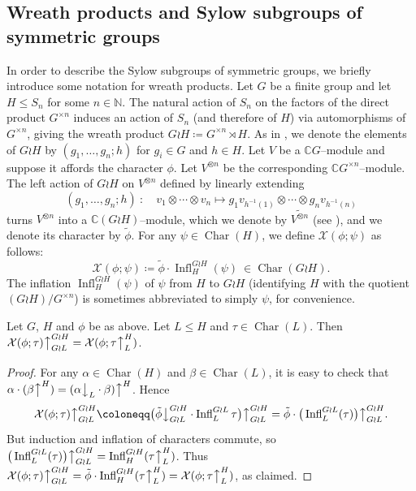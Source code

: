 \documentclass[ALCO, Unicode]{cedram}
\newcommand{\Ch}{\operatorname{Char}}
\newcommand{\Infl}{\operatorname{Infl}}
\newcommand{\down}{\big\downarrow}
\newcommand{\up}{\big\uparrow}
\newcommand{\cX}{\mathcal{X}}
\newcommand{\bC}{\mathbb{C}}
\newcommand{\N}{\mathbb{N}}
\begin{document}
\subsection{Wreath products and Sylow subgroups of symmetric groups}
In order to describe the Sylow subgroups of symmetric groups, we briefly introduce some notation for wreath products. Let $G$ be a finite group and let $H\le S_n$ for some $n\in\N$. The natural action of $S_n$ on the factors of the direct product $G^{\times n}$ induces an action of $S_n$ (and therefore of $H$) via automorphisms of $G^{\times n}$, giving the wreath product $G\wr H\coloneqq  G^{\times n}\rtimes H$.  
As in \cite[Chapter 4]{JK}, we denote the elements of $G\wr H$ by $(g_1,\dotsc,g_n;h)$ for $g_i\in G$ and $h\in H$. Let $V$ be a $\bC G$--module and suppose it affords the character $\phi$. Let $V^{\otimes n}$ be the corresponding $\bC G^{\times n}$--module. The left action of $G\wr H$ on $V^{\otimes n}$ defined by linearly extending
\[ (g_1,\dotsc,g_n;h)\ :\quad v_1\otimes \cdots\otimes v_n \longmapsto g_1v_{h^{-1}(1)}\otimes\cdots\otimes g_nv_{h^{-1}(n)} \]
turns $V^{\otimes n}$ into a $\bC(G\wr H)$--module, which we denote by $\widetilde{V^{\otimes n}}$ (see \cite[(4.3.7)]{JK}), and we denote its character by $\tilde{\phi}$. For any $\psi\in\Ch(H)$, we define $\cX(\phi;\psi)$ as follows:
\[ \cX(\phi;\psi)\coloneqq \tilde{\phi}\cdot\Infl_H^{G\wr H}(\psi)\ \in\Ch(G\wr H). \]
The inflation $\Infl_H^{G\wr H}(\psi)$ of $\psi$ from $H$ to $G\wr H$ (identifying $H$ with the quotient $(G\wr H)/G^{\times n}$) is sometimes abbreviated to simply $\psi$, for convenience.

\begin{lemma}\label{lem:infl-ind}
	Let $G$, $H$ and $\phi$ be as above. Let $L\le H$ and $\tau\in\Ch(L)$. Then $\cX(\phi;\tau)\up_{G\wr L}^{G\wr H} = \cX(\phi;\tau\up_L^H)$.
\end{lemma}
\begin{proof}
	For any $\alpha\in\Ch(H)$ and $\beta\in\Ch(L)$, it is easy to check that $\alpha\cdot(\beta\up^H)=(\alpha\down_L\cdot \beta)\up^H$. Hence
	\[ \cX(\phi;\tau)\up_{G\wr L}^{G\wr H} \coloneqq  \big( \tilde{\phi}\down_{G\wr L}^{G\wr H}\cdot\Infl_L^{G\wr L}\tau\big)\up_{G\wr L}^{G\wr H} = \tilde{\phi} \cdot \big(\Infl_L^{G\wr L}(\tau)\big)\up_{G\wr L}^{G\wr H}. \]
	But induction and inflation of characters commute, so $\big(\Infl_L^{G\wr L}(\tau)\big)\up_{G\wr L}^{G\wr H} = \Infl_H^{G\wr H}(\tau\up_L^H)$. Thus $\cX(\phi;\tau)\up_{G\wr L}^{G\wr H} = \tilde{\phi}\cdot \Infl_H^{G\wr H}(\tau\up_L^H) = \cX(\phi;\tau\up_L^H)$, as claimed.
\end{proof}
\end{document}
